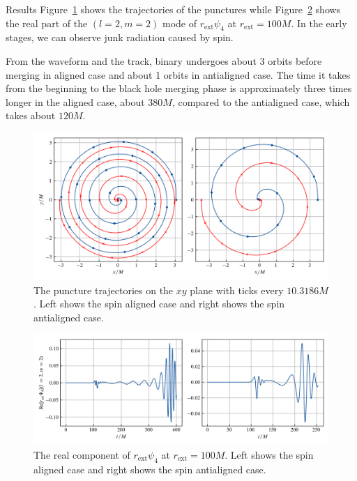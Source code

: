 \documentclass[noamssymb]{beamer}
\newlength{\colwidth}
\begin{document}
\begin{frame}[t]
\begin{columns}[t]
\begin{column}{\colwidth}
\begin{block}{Results}
  	Figure~\ref{fig:traj} shows the trajectories of the punctures while Figure~\ref{fig:rerpsi4} shows the real part of the $(l=2,m=2)$ mode of $r_\mathrm{ext}\psi_4$ at $r_\mathrm{ext}=100M$. In the early stages, we can observe junk radiation caused by spin.
  	
  	From the waveform and the track, binary undergoes about 3 orbits before merging in aligned case and about 1 orbits in antialigned case.
  	The time it takes from the beginning to the black hole merging phase is approximately three times longer in the aligned case, about $380M$, compared to the antialigned case, which takes about $120M$.
  	

	\begin{figure}
		\centering
		\includegraphics[width=\columnwidth]{img/traj}
		\caption{\label{fig:traj}The puncture trajectories on the $xy$ plane with ticks every $10.3186M$. Left shows the spin aligned case and right shows the spin antialigned case.}
	\end{figure}
	
	 
    \begin{figure}
      \centering
      \includegraphics[width=\columnwidth]{img/Rerpsi4}
      \caption{\label{fig:rerpsi4}The real component of $r_\mathrm{ext}\psi_4$ at $r_\mathrm{ext}=100M$. Left shows the spin aligned case and right shows the spin antialigned case.}
    \end{figure}
    

\end{block}
\end{column}
\end{columns}
\end{frame}
\end{document}
